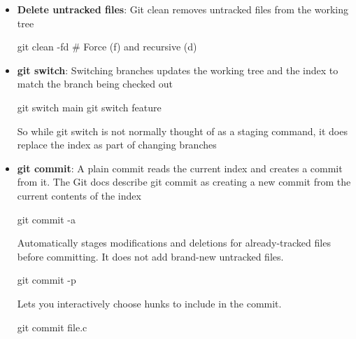 \documentclass{report}
\begin{document}
\begin{itemize}
\begin{itemize}
\begin{itemize}
\begin{enumerate}
                                \item usually preserves/protects local changes, unless we pass -f
                            \end{enumerate}
                    \end{itemize}
                \item \textbf{Delete untracked files}: Git clean removes untracked files from the working tree
                    \bigbreak \noindent 
                    \begin{bashcode}
                        git clean -fd # Force (f) and recursive (d)
                    \end{bashcode}
                \item \textbf{git switch}: Switching branches updates the working tree and the index to match the branch being checked out
                    \bigbreak \noindent 
                    \begin{bashcode}
                        git switch main
                        git switch feature
                    \end{bashcode}
                    \bigbreak \noindent 
                    So while git switch is not normally thought of as a staging command, it does replace the index as part of changing branches
                \item \textbf{git commit}: A plain commit reads the current index and creates a commit from it. The Git docs describe git commit as creating a new commit from the current contents of the index
                    \bigbreak \noindent 
                    \begin{bashcode}
                        git commit -a
                    \end{bashcode}
                    \bigbreak \noindent 
                    Automatically stages modifications and deletions for already-tracked files before committing. It does not add brand-new untracked files. 
                    \bigbreak \noindent 
                    \begin{bashcode}
                        git commit -p
                    \end{bashcode}
                    \bigbreak \noindent 
                    Lets you interactively choose hunks to include in the commit.
                    \bigbreak \noindent 
                    \begin{bashcode}
                        git commit file.c
                    \end{bashcode}

\end{itemize}
\end{itemize}
\end{document}
